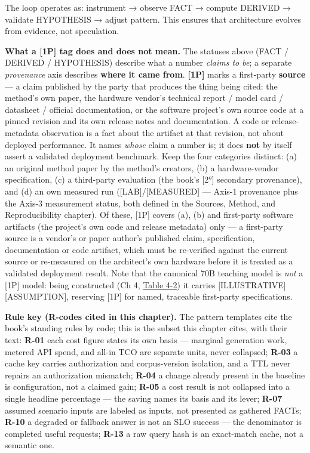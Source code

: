 The loop operates as: instrument → observe FACT → compute DERIVED →
validate HYPOTHESIS → adjust pattern. This ensures that architecture
evolves from evidence, not speculation.

\textbf{What a \mbox{{[}1P{]}} tag does and does not mean.} The statuses above
(FACT / DERIVED / HYPOTHESIS) describe what a number \emph{claims to
be}; a separate \emph{provenance} axis describes \textbf{where it came
from}. \textbf{\mbox{{[}1P{]}}} marks a first-party \textbf{source} --- a claim
published by the party that produces the thing being cited: the method's
own paper, the hardware vendor's technical report / model card /
datasheet / official documentation, or the software project's own source
code at a pinned revision and its own release notes and documentation. A
code or release-metadata observation is a fact about the artifact at
that revision, not about deployed performance. It names \emph{whose}
claim a number is; it does \textbf{not} by itself assert a validated
deployment benchmark. Keep the four categories distinct: (a) an original
method paper by the method's creators, (b) a hardware-vendor
specification, (c) a third-party evaluation (the book's \mbox{{[}2°{]}}
secondary provenance), and (d) an own measured run
(\mbox{{[}LAB{]}}/\mbox{{[}MEASURED{]}} --- Axis-1 provenance plus the Axis-3
measurement status, both defined in the Sources, Method, and
Reproducibility chapter). Of these, \mbox{{[}1P{]}} covers (a), (b) and
first-party software artifacts (the project's own code and release
metadata) only --- a first-party source is a vendor's or paper author's
published claim, specification, documentation or code artifact, which
must be re-verified against the current source or re-measured on the
architect's own hardware before it is treated as a validated deployment
result. Note that the canonical 70B teaching model is \emph{not} a
\mbox{{[}1P{]}} model: being constructed (Ch 4, \hyperref[tab:4.2]{Table 4-2}) it carries
\mbox{{[}ILLUSTRATIVE{]}}\hspace{0pt}\mbox{{[}ASSUMPTION{]}}, reserving \mbox{{[}1P{]}} for named,
traceable first-party specifications.

\textbf{Rule key (R-codes cited in this chapter).} The pattern templates
cite the book's standing rules by code; this is the subset this chapter
cites, with their text: \textbf{R-01} each cost figure states its own
basis --- marginal generation work, metered API spend, and all-in TCO
are separate units, never collapsed; \textbf{R-03} a cache key carries
authorization and corpus-version isolation, and a TTL never repairs an
authorization mismatch; \textbf{R-04} a change already present in the
baseline is configuration, not a claimed gain; \textbf{R-05} a cost
result is not collapsed into a single headline percentage --- the saving
names its basis and its lever; \textbf{R-07} assumed scenario inputs are
labeled as inputs, not presented as gathered FACTs; \textbf{R-10} a
degraded or fallback answer is not an SLO success --- the denominator is
completed useful requests; \textbf{R-13} a raw query hash is an
exact-match cache, not a semantic one.

